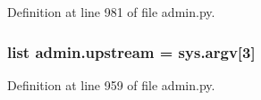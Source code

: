 Definition at line 981 of file admin.\-py.

\hypertarget{namespaceadmin_ae04b67153bc11f5b3a23e4fd760832fb}{
\subsubsection[{upstream}]{\setlength{\rightskip}{0pt plus 5cm}list admin.\-upstream = sys.\-argv\mbox{[}3\mbox{]}}}\label{namespaceadmin_ae04b67153bc11f5b3a23e4fd760832fb}


Definition at line 959 of file admin.\-py.


